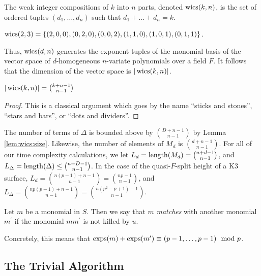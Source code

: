 \begin{defn}
    The weak integer compositions of $k$ into $n$ parts, 
    denoted $\operatorname{wics}(k, n)$, is the set of ordered tuples 
	\((d_{1}, \ldots, d_{n})\) such that 
    \(d_{1} + \ldots + d_{n} = k\).
\end{defn}

\begin{ex}
    $\operatorname{wics}(2, 3) = \lbrace (2, 0, 0), (0, 2, 0), (0, 0, 2), (1, 1, 0), (1, 0, 1), (0, 1, 1) \rbrace$.
\end{ex}

Thus, $\operatorname{wics}(d, n)$ generates the exponent tuples of the 
monomial basis of the vector space of $d$-homogeneous 
$n$-variate polynomials over a field $F$.
It follows that the dimension of the vector space is $|\operatorname{wics}(k, n)|$.

\begin{lem}
    \label{lem:wics:size}
    $|\operatorname{wics}(k, n)| = \binom{k + n - 1}{n - 1}$
\end{lem}

\begin{proof}
	This is a classical argument which goes by the 
    name ``sticks and stones'', ``stars and bars'', or 
    ``dots and dividers''.
\end{proof}


\begin{rmk}
    The number of terms of \(\Delta\) is bounded 
    above by \(\binom{D+n-1}{n-1}\) by Lemma \ref{lem:wics:size}.
    Likewise, the number of elements of 
    \(M_{d}\) is \(\binom{d+n-1}{n-1}\).
    For all of our time complexity calculations, 
    we let $L_{d} = \operatorname{length}(M_{d}) = \binom{n + d - 1}{n - 1}$, 
    and $L_{\Delta} = \operatorname{length}(\Delta) \leq \binom{n + D - 1}{n - 1}$.
    In the case of the quasi-\(F\)-split height of a K3 surface, 
    $L_{d} = \binom{n(p - 1) + n - 1}{n - 1} = \binom{np - 1}{n - 1}$, 
    and $L_{\Delta} = \binom{np(p - 1) + n - 1}{n - 1} = \binom{n(p^2 - p + 1) - 1}{n - 1}$.
\end{rmk}

\begin{defn}
	Let \(m\) be a monomial in \(S\). 
	Then we say that \(m\) \textit{matches}
	with another monomial \(m^{\prime}\) 
	if the monomial \(mm^{\prime}\) is
	not killed by \(u\).
\end{defn}

Concretely, this means that $\operatorname{exps}(m) + \operatorname{exps}(m^{\prime}) \equiv (p - 1, \dots, p - 1) \mod p$.

\subsection{The Trivial Algorithm}

